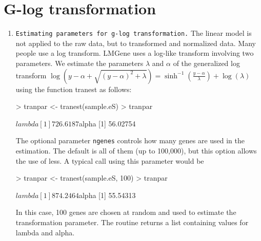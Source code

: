 \documentclass[11pt]{article}
\begin{document}
\section{G-log transformation}
\begin{enumerate}
\item {\tt Estimating parameters for g-log transformation.} 
The linear model is not applied to the raw data, but to transformed and normalized data. Many people use a log transform. LMGene uses a log-like transform involving two parameters. We estimate the parameters ${\lambda}$ and ${\alpha}$ of the generalized log
   transform ${\log{(y - {\alpha} + {\sqrt{(y - {\alpha})^2 + {\lambda}}})} = \sinh^{-1}(\frac{y-\alpha}{\lambda})}+\log(\lambda)$ using the
   function tranest as follows:

\begin{Schunk}
\begin{Sinput}
> tranpar <- tranest(sample.eS)
> tranpar
\end{Sinput}
\begin{Soutput}
$lambda
[1] 726.6187

$alpha
[1] 56.02754
\end{Soutput}
\end{Schunk}

   The optional parameter {\tt ngenes} controls how many genes are used in
   the estimation. The default is all of them (up to 100,000), but this option allows the use of less. A typical call using this parameter
   would be

\begin{Schunk}
\begin{Sinput}
> tranpar <- tranest(sample.eS, 100)
> tranpar
\end{Sinput}
\begin{Soutput}
$lambda
[1] 874.2464

$alpha
[1] 55.54313
\end{Soutput}
\end{Schunk}

   In this case, 100 genes are chosen at random and used to estimate
   the transformation parameter. The routine returns a list
   containing values for lambda and alpha.



\end{enumerate}
\end{document}
